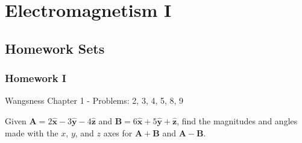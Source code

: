 
\chapter{Electromagnetism I}
    \section{Homework Sets}
        \subsection{Homework I}
            Wangsness Chapter 1 - Problems: 2, 3, 4, 5, 8, 9
            \begin{problem}
                Given
                $\mathbf{A}=2\hat{\mathbf{x}}%
                           -3\hat{\mathbf{y}}%
                           -4\hat{\mathbf{z}}$
                and
                $\mathbf{B}=6\hat{\mathbf{x}}%
                           +5\hat{\mathbf{y}}%
                            +\hat{\mathbf{z}}$,
                find the magnitudes and angles made with the $x$,
                $y$, and $z$ axes for $\mathbf{A}+\mathbf{B}$
                and $\mathbf{A}-\mathbf{B}$.
            \end{problem}

